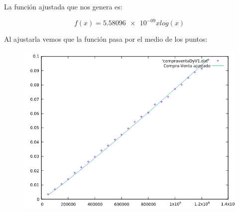 \documentclass[12pt, spanish]{article}
\begin{document}
La función ajustada que nos genera es:

\[f(x)=\num{5.58096e-09}xlog(x)\]

\newpage

Al ajustarla vemos que la función pasa por el medio de los puntos:
\begin{figure}[H]
  \centering
  \includegraphics[scale = 0.8]{ajusteDyV.png}
\end{figure}

\vspace{5cm}
 
 
\end{document}
